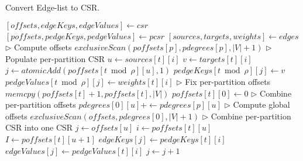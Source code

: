 \begin{algorithm}[hbtp]
\caption{Convert Edge-list to CSR.}
\label{alg:csr}
\begin{algorithmic}[1]

\Statex

  \State $[offsets, edgeKeys, edgeValues] \gets csr$
  \State $[poffsets, pedgeKeys, pedgeValues] \gets pcsr$
  \State $[sources, targets, weights] \gets edges$
  \State $\rhd$ Compute offsets
  \ForAll{$p \in [0, \rho)$}
    \State $exclusiveScan(poffsets[p], pdegrees[p], |V|+1)$
  \EndFor
  \State $\rhd$ Populate per-partition CSR
    \ForAll{$i \in [0, counts[t])$}
      \State $u \gets sources[t][i]$
      \State $v \gets targets[t][i]$
      \State $j \gets atomicAdd(poffsets[t \bmod \rho][u], 1)$
      \State $pedgeKeys[t \bmod \rho][j] \gets v$
        \State $pedgeValues[t \bmod \rho][j] \gets weights[t][i]$
      \EndIf
    \EndFor
  \EndFor
  \State $\rhd$ Fix per-partition offsets
      \State $memcpy(poffsets[t]+1, poffsets[t], |V|)$
      \State $poffsets[t][0] \gets 0$
    \EndIf
  \EndFor
  \State $\rhd$ Combine per-partition offsets
  \ForAll{$u \in [0, |V|)$ \textbf{in parallel}}
    \ForAll{$p \in [1, \rho)$}
      \State $pdegrees[0][u] +\gets pdegrees[p][u]$
    \EndFor
  \EndFor
  \State $\rhd$ Compute global offsets
  \State $exclusiveScan(offsets, pdegrees[0], |V|+1)$
  \State $\rhd$ Combine per-partition CSR into one CSR
  \ForAll{$u \in [0, |V|)$ \textbf{in parallel}}
    \State $j \gets offsets[u]$
    \ForAll{$p \in [0, \rho)$}
      \State $i \gets poffsets[t][u]$
      \State $I \gets poffsets[t][u+1]$
      \ForAll{$i \in [i, I)$}
        \State $edgeKeys[j] \gets pedgeKeys[t][i]$
          \State $edgeValues[j] \gets pedgeValues[t][i]$
        \EndIf
        \State $j \gets j + 1$
      \EndFor
    \EndFor
  \EndFor
\EndFunction
\end{algorithmic}
\end{algorithm}
